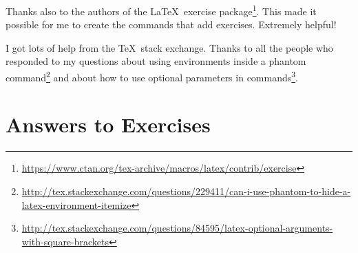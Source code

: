 \documentclass[letter,12pt]{article}
\begin{document}
Thanks also to the authors of the \LaTeX\ exercise package\footnote{\url{https://www.ctan.org/tex-archive/macros/latex/contrib/exercise}}.  This made it possible for me to create the commands that add exercises.  Extremely helpful!

I got lots of help from the \TeX\ stack exchange.  Thanks to all the people who responded to my questions about using environments inside  a phantom command\footnote{\url{http://tex.stackexchange.com/questions/229411/can-i-use-phantom-to-hide-a-latex-environment-itemize}} and about how to use optional parameters in commands\footnote{\url{http://tex.stackexchange.com/questions/84595/latex-optional-arguments-with-square-brackets}}.


\appendix

\section{Answers to Exercises}

\shipoutAnswer
\end{document}
